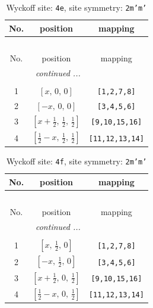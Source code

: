 \documentclass[fleqn,8pt]{jsarticle}
\begin{document}
\begin{longtable}{ccc}
\caption{Wyckoff site: {\tt 4e}, site symmetry: {\tt 2m'm'}}
 \\
 \hline \hline
No. & position & mapping \\ \hline \endfirsthead

\multicolumn{2}{l}{\tablename\ \thetable{}} \\
 \hline \hline
No. & position & mapping \\ \hline \endhead

 \hline \hline
\multicolumn{2}{r}{\footnotesize\it continued ...} \\ \endfoot

 \hline \hline
\multicolumn{2}{r}{} \\ \endlastfoot

1 & $\left[ x,\, 0,\, 0 \right]$ & {\tt [1,2,7,8]} \\ \hline
2 & $\left[ - x,\, 0,\, 0 \right]$ & {\tt [3,4,5,6]} \\ \hline
3 & $\left[ x + \frac{1}{2},\, \frac{1}{2},\, \frac{1}{2} \right]$ & {\tt [9,10,15,16]} \\ \hline
4 & $\left[ \frac{1}{2} - x,\, \frac{1}{2},\, \frac{1}{2} \right]$ & {\tt [11,12,13,14]} \\
\end{longtable}
\renewcommand{\arraystretch}{1.2}
\begin{longtable}{ccc}
\caption{Wyckoff site: {\tt 4f}, site symmetry: {\tt 2m'm'}}
 \\
 \hline \hline
No. & position & mapping \\ \hline \endfirsthead

\multicolumn{2}{l}{\tablename\ \thetable{}} \\
 \hline \hline
No. & position & mapping \\ \hline \endhead

 \hline \hline
\multicolumn{2}{r}{\footnotesize\it continued ...} \\ \endfoot

 \hline \hline
\multicolumn{2}{r}{} \\ \endlastfoot

1 & $\left[ x,\, \frac{1}{2},\, 0 \right]$ & {\tt [1,2,7,8]} \\ \hline
2 & $\left[ - x,\, \frac{1}{2},\, 0 \right]$ & {\tt [3,4,5,6]} \\ \hline
3 & $\left[ x + \frac{1}{2},\, 0,\, \frac{1}{2} \right]$ & {\tt [9,10,15,16]} \\ \hline
4 & $\left[ \frac{1}{2} - x,\, 0,\, \frac{1}{2} \right]$ & {\tt [11,12,13,14]} \\
\end{longtable}
\end{document}
